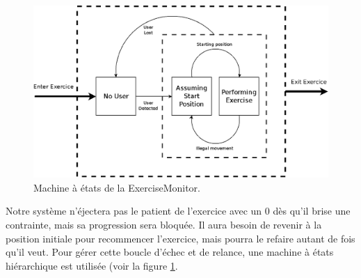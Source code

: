 \begin{figure}[h!]
\centering
\includegraphics[width=0.9\linewidth]{../images/exercise_monitor}
\caption{Machine à états de la ExerciseMonitor.}
\label{fig:exercise_monitor}
\end{figure}

Notre système n'éjectera pas le patient de l'exercice avec un 0 dès qu'il brise 
une contrainte, mais sa progression sera bloquée. Il aura besoin de revenir à la
position initiale pour recommencer l'exercice, mais pourra le refaire autant de fois
qu'il veut. Pour gérer cette boucle d'échec et de relance, une machine à états
hiérarchique est utilisée (voir la figure \ref{fig:exercise_monitor}.
    